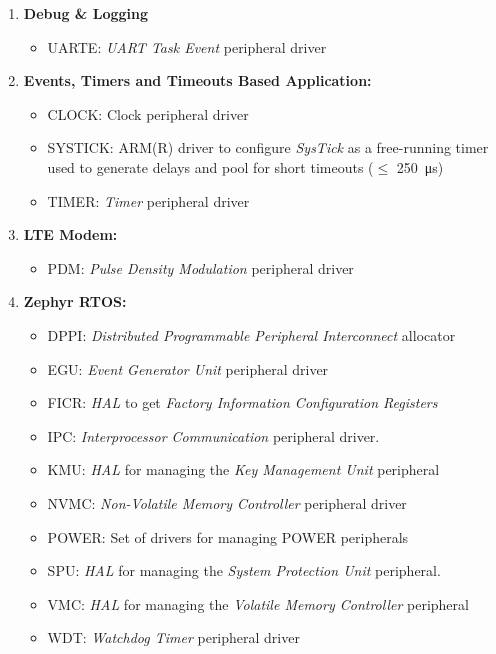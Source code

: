 \documentclass[report.tex]{subfiles}
\begin{document}
\begin{enumerate}
\item \textbf{Debug \& Logging}
\begin{itemize}
\item UARTE: \textit{UART Task Event} peripheral driver
\end{itemize}

\item \textbf{Events, Timers and Timeouts Based Application:}
\begin{itemize}
\item CLOCK: Clock peripheral driver
\item SYSTICK: ARM(R) driver to configure \textit{SysTick} as a free-running timer used to generate delays and pool for short timeouts ($\leq$ \SI{250}{\micro\second})
\item TIMER: \textit{Timer} peripheral driver
\end{itemize}

\item \textbf{LTE Modem:}
\begin{itemize}
\item PDM: \textit{Pulse Density Modulation} peripheral driver
\end{itemize}

\item \textbf{Zephyr RTOS:}
\begin{itemize}
\item DPPI: \textit{Distributed Programmable Peripheral Interconnect} allocator
\item EGU: \textit{Event Generator Unit} peripheral driver
\item FICR: \textit{HAL} to get \textit{Factory Information Configuration Registers}
\item IPC: \textit{Interprocessor Communication} peripheral driver.
\item KMU: \textit{HAL} for managing the \textit{Key Management Unit} peripheral
\item NVMC: \textit{Non-Volatile Memory Controller} peripheral driver
\item POWER: Set of drivers for managing POWER peripherals
\item SPU: \textit{HAL} for managing the \textit{System Protection Unit} peripheral.
\item VMC: \textit{HAL} for managing the \textit{Volatile Memory Controller} peripheral
\item WDT: \textit{Watchdog Timer} peripheral driver
\end{itemize}
\end{enumerate}
\end{document}
